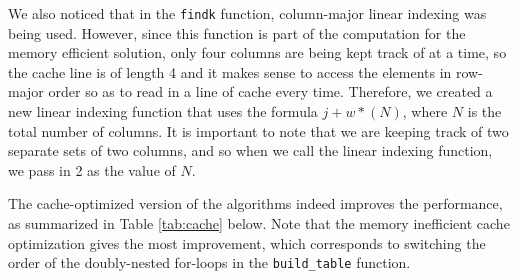 \documentclass[10pt]{article}
\begin{document}
\begin{enumerate}
We also noticed that in the \texttt{findk} function, column-major linear indexing was being used. However, since this function is part of the computation for the memory efficient solution, only four columns are being kept track of at a time, so the cache line is of length 4 and it makes sense to access the elements in row-major order so as to read in a line of cache every time. Therefore, we created a new linear indexing function that uses the formula $j+w*(N)$, where $N$ is the total number of columns. It is important to note that we are keeping track of two separate sets of two columns, and so when we call the linear indexing function, we pass in 2 as the value of $N$. 

The cache-optimized version of the algorithms indeed improves the performance, as summarized in Table \ref{tab:cache} below. Note that the memory inefficient cache optimization gives the most improvement, which corresponds to switching the order of the doubly-nested for-loops in the \texttt{build\_table} function.


\end{enumerate}
\end{document}
